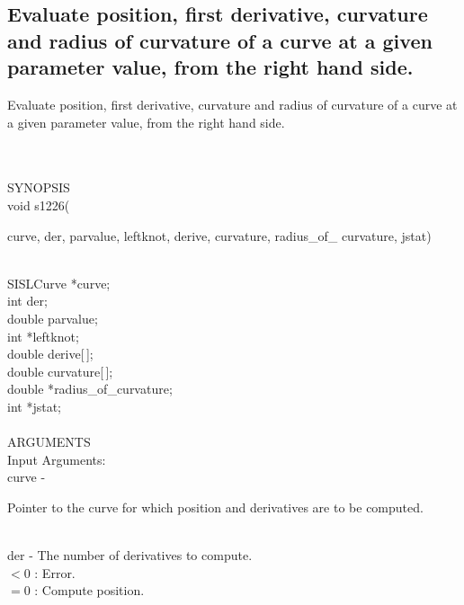 \subsection{Evaluate position, first derivative, curvature and radius of
               curvature of a curve at a given parameter value, from the
               right hand side.}
\begin{minipg1}
Evaluate position, first derivative, curvature and radius of
               curvature of a curve at a given parameter value, from the
               right hand side.
\end{minipg1} \\ \\
SYNOPSIS\\
        \> void s1226(\begin{minipg3}
            {\fov curve}, {\fov der}, {\fov parvalue}, {\fov leftknot}, {\fov derive}, {\fov curvature},
	   radius\_of\_ {\fov curvature}, {\fov jstat})
                \end{minipg3}\\
                \>\>    SISLCurve    \>  *{\fov curve};\\
                \>\>    int    \>  {\fov der};\\
                \>\>    double \> parvalue;\\
                \>\>    int    \>  *{\fov leftknot};\\
                \>\>    double \> derive[\,];\\
                \>\>    double \> curvature[\,];\\
                \>\>    double \>*{\fov radius}\_of\_curvature;\\
                \>\>    int    \>  *{\fov jstat};\\
\\
ARGUMENTS\\
	\>Input Arguments:\\
        \>\>    {\fov curve}\> - \>  \begin{minipg2}
                     Pointer to the curve for which position
                       and derivatives are to be computed.
                               \end{minipg2}\\
        \>\>    {\fov der}\> - \> The number of derivatives to compute.\\
	            \>\>\>\>\>       $< 0$ : Error.\\
		    \>\>\>\>\>       $= 0$ : Compute position.\\
